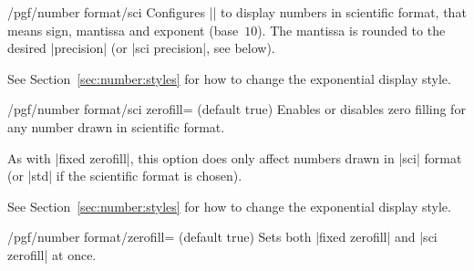 \documentclass[a4paper]{ltxdoc}
\begin{document}
\begin{key}{/pgf/number format/sci}
    Configures |\pgfmathprintnumber| to display numbers in scientific format,
    that means sign, mantissa and exponent (base~$10$). The mantissa is rounded
    to the desired |precision| (or |sci precision|, see below).
\begin{codeexample}[]
\hspace{1em}
\hspace{1em}
\hspace{1em}
\hspace{1em}
\end{codeexample}

    See Section~\ref{sec:number:styles} for how to change the exponential
    display style.
\end{key}

\begin{key}{/pgf/number format/sci zerofill=  (default true)}
    Enables or disables zero filling for any number drawn in scientific format.
\begin{codeexample}[]
\hspace{1em}
\hspace{1em}
\hspace{1em}
\hspace{1em}
\end{codeexample}
    As with |fixed zerofill|, this option does only affect numbers drawn in
    |sci| format (or |std| if the scientific format is chosen).

    See Section~\ref{sec:number:styles} for how to change the exponential
    display style.
\end{key}

\begin{stylekey}{/pgf/number format/zerofill= (default true)}
    Sets both |fixed zerofill| and |sci zerofill| at once.
\end{stylekey}
\end{document}
